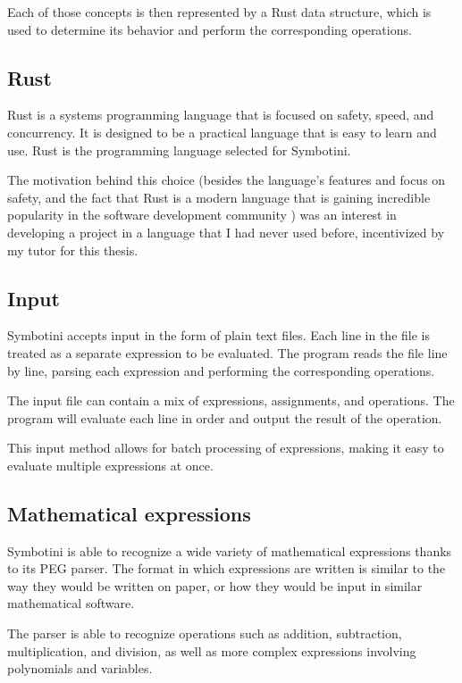 Each of those concepts is then represented by a Rust data structure, which is used to determine its behavior and perform the corresponding operations.

\subsection{Rust}\label{subsec:rust}

Rust \parencite{matsakis2014rust} is a systems programming language that is focused on safety, speed, and concurrency. It is designed to be a practical language that is easy to learn and use. Rust is the programming language selected for Symbotini.

The motivation behind this choice (besides the language's features and focus on safety, and the fact that Rust is a modern language that is gaining incredible popularity in the software development community \parencite{stack-overflow-survey}) was an interest in developing a project in a language that I had never used before, incentivized by my tutor for this thesis.

\subsection{Input}\label{subsec:input}

Symbotini accepts input in the form of plain text files. Each line in the file is treated as a separate expression to be evaluated. The program reads the file line by line, parsing each expression and performing the corresponding operations.

The input file can contain a mix of expressions, assignments, and operations. The program will evaluate each line in order and output the result of the operation.

This input method allows for batch processing of expressions, making it easy to evaluate multiple expressions at once.

\subsection{Mathematical expressions}\label{subsec:mathematical-expressions}

Symbotini is able to recognize a wide variety of mathematical expressions thanks to its PEG parser. The format in which expressions are written is similar to the way they would be written on paper, or how they would be input in similar mathematical software.

The parser is able to recognize operations such as addition, subtraction, multiplication, and division, as well as more complex expressions involving polynomials and variables.

